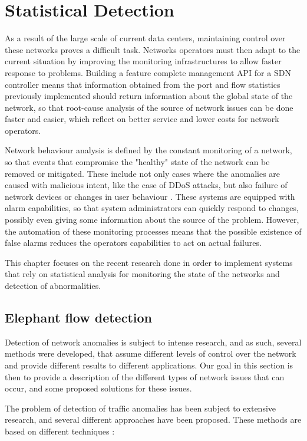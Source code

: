 \chapter{Statistical Detection} \label{chap:stat_det} %

As a result of the large scale of current data centers, maintaining control over these networks proves a difficult task. Networks operators must then adapt to the current situation by improving the monitoring infrastructures 
to allow faster response to problems.  Building a feature complete management API for a SDN controller means that information obtained from the port and flow statistics previously implemented should return information 
about the global state of the network, so that root-cause analysis of the source of network issues can be done faster and easier, which reflect on better service and lower costs for network operators. 
\par Network behaviour analysis is defined by the constant monitoring of a network, so that events that compromise the "healthy" state of the network can be removed or mitigated. These include not only cases where the anomalies are
caused with malicious intent, like the case of DDoS attacks, but also failure of network devices or changes in user behaviour \cite {traffic_anomaly_control_charts}. These systems are equipped with alarm capabilities, so that 
system administrators can quickly respond to changes, possibly even giving some information about the source of the problem. However, the automation of these monitoring processes means that the possible existence
of false alarms reduces the operators capabilities to act on actual failures. 
\par This chapter focuses on the recent research done in order to implement systems that rely on statistical analysis for monitoring the state of the networks and detection of abnormalities.

\section {Elephant flow detection}

Detection of network anomalies is subject to intense research, and as such, several methods were developed, that assume different levels of control over the network and provide different results to different applications. Our goal
in this section is then to provide a description of the different types of network issues that can occur, and some proposed solutions for these issues.
\par The problem of detection of traffic anomalies has been subject to extensive research, and several different approaches have been proposed. These methods are based on different techniques 
\cite {http://shiftleft.com/mirrors/www.hpl.hp.com/personal/Praveen_Yalagandula/papers/INFOCOM11.pdf}:

